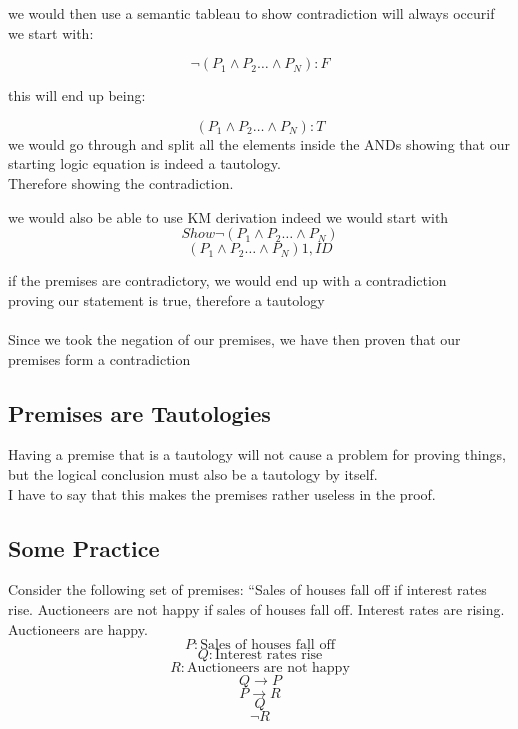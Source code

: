 \documentclass[a4paper,12pt]{article}
\begin{document}
we would then use a semantic tableau to show contradiction will always occurif we start with:

  \[ \lnot ( P_{1} \wedge P_{2} \dots \wedge P_{N}) : F \]

this will end up being:

  \[ ( P_{1} \wedge P_{2} \dots \wedge P_{N}) : T\]
  we would go through and split all the elements inside the ANDs
  showing that our starting logic equation is indeed a tautology.\\
  Therefore showing the contradiction.\\

\bigskip

we would also be able to use KM derivation
indeed we would start with
  \[ Show \lnot ( P_{1} \wedge P_{2} \dots \wedge P_{N}) \]
  \[( P_{1} \wedge P_{2} \dots \wedge P_{N}) 1,ID\] 
  
if the premises are contradictory, we would end up with a contradiction\\
proving our statement is true, therefore a tautology\\
\bigskip\\
Since we took the negation of our premises, we have then proven that our premises form a contradiction\\

\subsection{Premises are Tautologies}
Having a premise that is a tautology will not cause a problem for proving things, but the logical conclusion must also be a tautology by itself.\\
I have to say that this makes the premises rather useless in the proof.\\
\subsection{Some Practice}
Consider the following set of premises: ``Sales of houses fall off if interest rates rise. Auctioneers are not happy if sales of houses fall off. Interest rates are rising. Auctioneers are happy.
\[
P: \text{Sales of houses fall off} 
\]
\[
Q: \text{Interest rates rise}
\]
\[
R: \text{Auctioneers are not happy}
\]
\begin{equation} 
Q\rightarrow P 
\end{equation}
\begin{equation} 
P \rightarrow R
\end{equation}
\begin{equation} 
Q
\end{equation}
\begin{equation} 
\lnot R
\end{equation}
\end{document}

